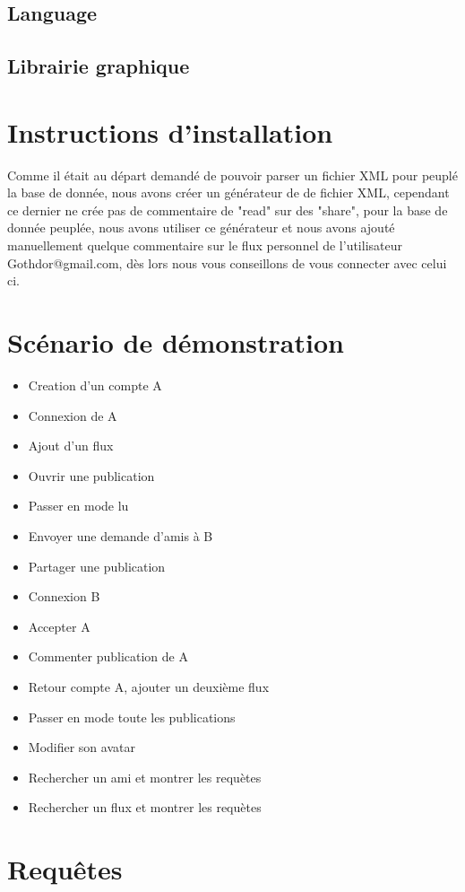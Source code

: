 \documentclass[a4paper,10pt]{article}
\begin{document}
\subsection{Language}
\subsection{Librairie graphique}
		
\section{Instructions d'installation}

Comme il était au départ demandé de pouvoir parser un fichier XML pour peuplé la base de donnée, nous avons créer un générateur de de fichier XML, cependant ce dernier ne crée pas de commentaire de "read" sur des "share", pour la base de donnée peuplée, nous avons utiliser ce générateur et nous avons ajouté manuellement quelque commentaire sur le flux personnel de l'utilisateur Gothdor@gmail.com, dès lors nous vous conseillons de vous connecter avec celui ci.
		
\section{Scénario de démonstration}
\begin{itemize}
\item Creation d'un compte A
\item Connexion de A
\item Ajout d'un flux
\item Ouvrir une publication
\item Passer en mode lu
\item Envoyer une demande d'amis à B
\item Partager une publication
\item Connexion B
\item Accepter A
\item Commenter publication de A
\item Retour compte A, ajouter un deuxième flux
\item Passer en mode toute les publications
\item Modifier son avatar
\item Rechercher un ami et montrer les requètes
\item Rechercher un flux et montrer les requètes
\end{itemize}
		
\section{Requêtes}
\end{document}
